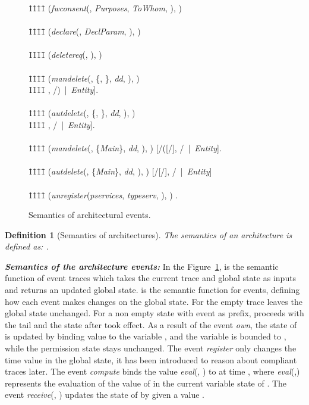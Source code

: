 \documentclass[a4paper]{article}
\newtheorem{ttd}{Definition}
\begin{document}
\begin{figure}[htbp]
{\begin{minipage}{11.87 cm}
\begin{tabbing}
\=1\=1\=1\=1\= \kill
(\textit{fwconsent}(, \textit{Purposes}, \textit{ToWhom}, ),  )  \\\\ 
\=1\=1\=1\=1\= \kill
(\textit{declare}(, \textit{DeclParam}, ), )   \\\\ 
\=1\=1\=1\=1\= \kill
(\textit{deletereq}(, ), )   \\\\ 
\=1\=1\=1\=1\= \kill
(\textit{mandelete}(, \{, \}, \textit{dd}, ), )\\
\=1\=1\=1\=1\= \kill
\>\>    [/[/, \textit{Cp}()/], /)\ |\    \textit{Entity}].\\\\
\=1\=1\=1\=1\= \kill
(\textit{autdelete}(, \{, \}, \textit{dd}, ), ) \\
\=1\=1\=1\=1\= \kill
\>\>    [ / ([\{/, \textit{Cp}()/\}], /\ |\    \textit{Entity}].\\\\
\=1\=1\=1\=1\= \kill
(\textit{mandelete}(, \{\textit{Main}\}, \textit{dd}, ), )    [/([/], /\ |\    \textit{Entity}].\\\\
\=1\=1\=1\=1\= \kill
(\textit{autdelete}(, \{\textit{Main}\}, \textit{dd}, ), )    [/[/], /\ |\    \textit{Entity}]\\\\
\=1\=1\=1\=1\= \kill	
(\textit{unregister}(\textit{pservices}, \textit{typeserv}, ), )  .
   \end{tabbing}
\end{minipage}
}
\caption{Semantics of architectural events.}\label{fig:semevent}
\end{figure}

\begin{ttd}[Semantics of architectures]
The semantics of an architecture  is defined as:
.
\end{ttd}

\textit{\textbf{Semantics of the architecture events:}} In the Figure~\ref{fig:semevent},  is the semantic function of event traces which takes the current trace and global state as inputs and returns an updated global state.  is the semantic function for events, defining how each event makes changes on the global state. For the empty trace  leaves the global state unchanged. For a non empty state with event  as prefix,  proceeds with the tail  and the state after  took effect. As a result of the event \textit{own}, the state of  is updated by binding value  to the variable , and the variable  is bounded to , while the permission state stays unchanged. The event \textit{register} only changes the time value in the global state, it has been introduced to reason about compliant traces later. The event \textit{compute} binds the value \textit{eval}(, ) to  at time , where \textit{eval}(,) represents the evaluation of the value of  in the current variable state of . The event \textit{receive}(, ) updates the state of  by given  a value . 
\end{document}
